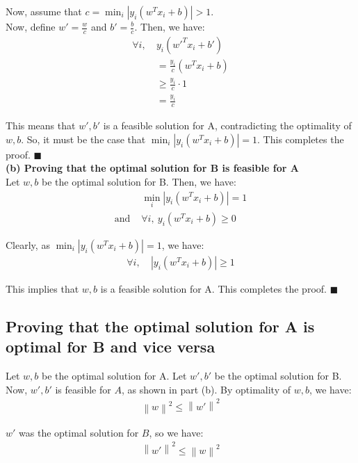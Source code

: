 \documentclass[a4paper]{article}
\newcommand{\norm}[1]{\left\lVert#1\right\rVert}
\begin{document}
Now, assume that $c = \min_i | y_i(w^T x_i + b) | > 1$.\\

Now, define $w' = \frac{w}{c}$ and $b' = \frac{b}{c}$. Then, we have:
\begin{align*}
    \forall i, \ &y_i(w'^T x_i + b')\\
    &= \frac{y_i}{c}(w^T x_i + b)\\
    &\geq \frac{y_i}{c} \cdot 1\\
    &= \frac{y_i}{c}
\end{align*}

This means that $w', b'$ is a feasible solution for A, contradicting the optimality of $w, b$. So, it must be the case that $\min_i | y_i(w^T x_i + b) | = 1$. This completes the proof. $\blacksquare$\\

\textbf{(b) Proving that the optimal solution for B is feasible for A}\\

Let $w, b$ be the optimal solution for B. Then, we have:
\begin{align*}
    &\min_i | y_i(w^T x_i + b) | = 1\\
    \text{and } &\forall i, \ y_i(w^T x_i + b) \geq 0
\end{align*}

Clearly, as $\min_i | y_i(w^T x_i + b) | = 1$, we have:
\begin{align*}
    \forall i, \ &| y_i(w^T x_i + b) | \geq 1
\end{align*}

This implies that $w, b$ is a feasible solution for A. This completes the proof. $\blacksquare$\\

\subsection{Proving that the optimal solution for A is optimal for B and vice versa}

Let $w, b$ be the optimal solution for A. Let $w', b'$ be the optimal solution for B.\\

Now, $w', b'$ is feasible for $A$, as shown in part (b). By optimality of $w, b$, we have:
\begin{align*}
    \norm{w}^2 \leq \norm{w'}^2
\end{align*}

$w'$ was the optimal solution for $B$, so we have:
\begin{align*}
    \norm{w'}^2 \leq \norm{w}^2
\end{align*}
\end{document}
